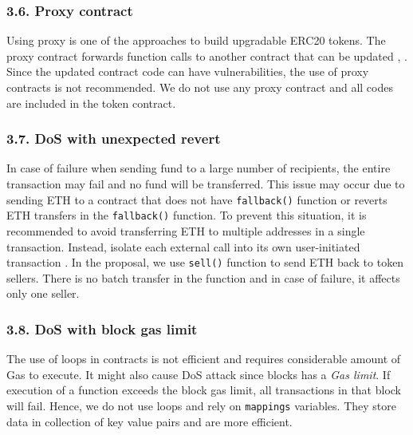 \subsubsection*{3.6. Proxy contract}
Using proxy is one of the approaches to build upgradable ERC20 tokens. The proxy contract forwards function calls to another contract that can be updated \cite{ProxyContract}, \cite{ProxyPatterns}. Since the updated contract code can have vulnerabilities, the use of proxy contracts is not recommended. We do not use any proxy contract and all codes are included in the token contract.

\subsubsection*{3.7. DoS with unexpected revert}
In case of failure when sending fund to a large number of recipients, the entire transaction may fail and no fund will be transferred. This issue may occur due to sending ETH to a contract that does not have \texttt{fallback()} function or reverts ETH transfers in the \texttt{fallback()} function. To prevent this situation, it is recommended to avoid transferring ETH to multiple addresses in a single transaction. Instead, isolate each external call into its own user-initiated transaction \cite{DosRevert}. In the proposal, we use \texttt{sell()} function to send ETH back to token sellers. There is no batch transfer in the function and in case of failure, it affects only one seller.

\subsubsection*{3.8. DoS with block gas limit}
The use of loops in contracts is not efficient and requires considerable amount of Gas to execute. It might also cause DoS attack since blocks has a \textit{Gas limit}. If execution of a function exceeds the block gas limit, all transactions in that block will fail. Hence, we do not use loops and rely on \texttt{mappings} variables. They store data in collection of key value pairs and are more efficient.